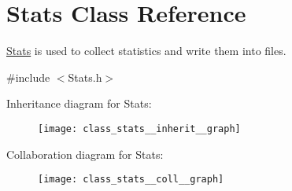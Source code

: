 \hypertarget{class_stats}{}\section{Stats Class Reference}
\label{class_stats}


\hyperlink{class_stats}{Stats} is used to collect statistics and write them into files.  




{\ttfamily \#include $<$Stats.\+h$>$}



Inheritance diagram for Stats\+:\nopagebreak
\begin{figure}[H]
\begin{center}
\leavevmode
\texttt{[image: class\_stats\_\_inherit\_\_graph]}
\end{center}
\end{figure}


Collaboration diagram for Stats\+:\nopagebreak
\begin{figure}[H]
\begin{center}
\leavevmode
\texttt{[image: class\_stats\_\_coll\_\_graph]}
\end{center}
\end{figure}
